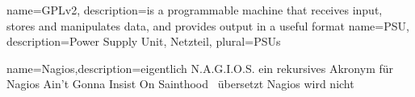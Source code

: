 	{
 	 name=GPLv2,
 	 description={is a programmable machine that receives input,
               stores and manipulates data, and provides
               output in a useful format}
	}
	{
	name=PSU,
	description={Power Supply Unit, Netzteil},
	plural=PSUs
	}
	
{
	name={Nagios},description={eigentlich N.A.G.I.O.S. ein rekursives Akronym für \glqq Nagios Ain’t Gonna Insist On Sainthood \grqq\ übersetzt \glqq Nagios wird nicht  }}


